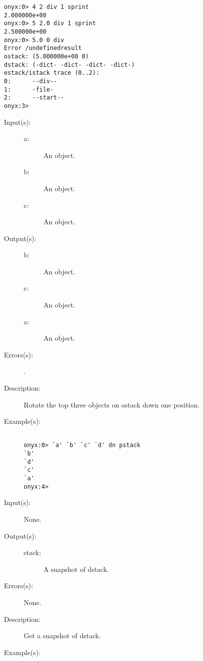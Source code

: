 \begin{description}
\begin{description}
\begin{verbatim}
onyx:0> 4 2 div 1 sprint
2.000000e+00
onyx:0> 5 2.0 div 1 sprint
2.500000e+00
onyx:0> 5.0 0 div
Error /undefinedresult
ostack: (5.000000e+00 0)
dstack: (-dict- -dict- -dict- -dict-)
estack/istack trace (0..2):
0:      --div--
1:      -file-
2:      --start--
onyx:3>
		\end{verbatim}
	\end{description}
\label{systemdict:dn}
\item[{\onyxop{a b c}{dn}{b c a}}: ]
	\begin{description}\item[]
	\item[Input(s): ]
		\begin{description}\item[]
		\item[a: ]
			An object.
		\item[b: ]
			An object.
		\item[c: ]
			An object.
		\end{description}
	\item[Output(s): ]
		\begin{description}\item[]
		\item[b: ]
			An object.
		\item[c: ]
			An object.
		\item[a: ]
			An object.
		\end{description}
	\item[Errors(s): ]
		\begin{description}\item[]
		\item[.]
		\end{description}
	\item[Description: ]
		Rotate the top three objects on ostack down one position.
	\item[Example(s): ]\begin{verbatim}

onyx:0> `a' `b' `c' `d' dn pstack
`b'
`d'
`c'
`a'
onyx:4>
		\end{verbatim}
	\end{description}
\label{systemdict:dstack}
\item[{\onyxop{--}{dstack}{stack}}: ]
	\begin{description}\item[]
	\item[Input(s): ] None.
	\item[Output(s): ]
		\begin{description}\item[]
		\item[stack: ]
			A snapshot of dstack.
		\end{description}
	\item[Errors(s): ] None.
	\item[Description: ]
		Get a snapshot of dstack.
	\item[Example(s): ]\begin{verbatim}


\end{verbatim}
\end{description}
\end{description}
